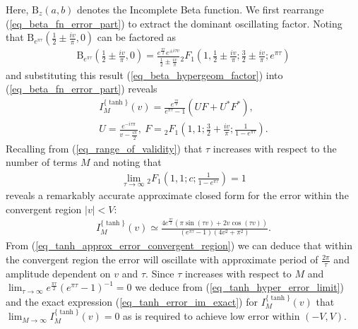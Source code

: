 Here, $\mathrm{B}_z(a,b)$ denotes the Incomplete Beta function.
We first rearrange (\ref{eq_beta_fn_error_part}) to extract the
dominant oscillating factor.  Noting that
$\mathrm{B}_{e^{\pi \tau}}\left(\frac{1}{2} \pm \frac{iv}{\pi}, 0 \right)$
can be factored as
\begin{align}
	\mathrm{B}_{e^{\pi \tau}}\left(\frac{1}{2} \pm \frac{iv}{\pi}, 0 \right)
	= \frac{e^{\frac{\pi\tau}{2}} e^{\pm i \tau v}}{\frac{1}{2} \pm \frac{iv}{\pi}}
	{}_{2}F_{1}\left(1, \frac{1}{2} \pm \frac{i v}{\pi};
	\frac{3}{2} \pm \frac{i v}{\pi};
	e^{\pi \tau}\right)
	\label{eq_beta_hypergeom_factor}
\end{align}
and substituting this result (\ref{eq_beta_hypergeom_factor}) into
(\ref{eq_beta_fn_error_part}) reveals
\begin{gather}
	I_M^{\{\tanh\}}(v) = 
	\frac{e^{\frac{\tau \pi}{2}}}{e^{\pi \tau} - 1}
	\left(U F + U^* F^*\right),
	\label{eq_tanh_error_im_exact}
	\\
	U = \frac{e^{-i \tau \pi}}{v - \frac{i \pi}{2}}, \ 
	F = {}_{2}F_{1}\left(1, 1;
	\frac{3}{2} + \frac{i v}{\pi};
	\frac{1}{1 - e^{\pi \tau}}\right).
\end{gather}
Recalling from (\ref{eq_range_of_validity}) that $\tau$ increases
with respect to the number of terms $M$ and noting that
\begin{align}
	\lim_{\tau \to \infty} {}_{2}F_{1}\left(1, 1; c; \frac{1}{1-e^{\pi \tau}}\right) = 1
	\label{eq_tanh_hyper_error_limit}
\end{align}
reveals a remarkably accurate approximate closed form for the error within
the convergent region $|v| < V$:
\begin{align}
	I_M^{\{\tanh\}}(v) \simeq
	\frac{
		4 e^{\frac{\pi \tau}{2}}
		\left(\pi \sin(\tau v) + 2 v \cos(\tau v)\right)
	}{(e^{\pi \tau} - 1)(4v^2 + \pi^2)}.
	\label{eq_tanh_approx_error_convergent_region}
\end{align}
From (\ref{eq_tanh_approx_error_convergent_region}) we can deduce
that within the convergent region the error will oscillate
with approximate period of $\frac{2 \pi}{\tau}$ and amplitude
dependent on $v$ and $\tau$.  Since $\tau$ increases with respect to $M$ and
$\lim_{\tau \to \infty} e^{\frac{\pi \tau}{2}}(e^{\pi \tau} - 1)^{-1} = 0$
we deduce from (\ref{eq_tanh_hyper_error_limit}) and the exact
expression (\ref{eq_tanh_error_im_exact}) for $I_M^{\{\tanh\}}(v)$ that
$\lim_{M \to \infty} I_M^{\{\tanh\}}(v) = 0$ as is
required to achieve low error within $(-V, V)$.

